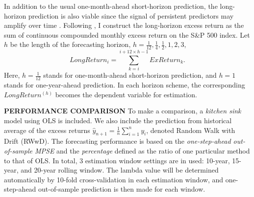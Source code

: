 \documentclass[12pt,a4paper]{article}
\begin{document}
In addition to the usual one-month-ahead short-horizon prediction, the long-horizon prediction is also viable since the signal of persistent predictors may amplify over time \citep{cochrane2009asset}. Following \cite{lee2018lasso}, I construct the long-horizon excess return as the sum of continuous compounded monthly excess return on the S\&P 500 index. Let $ h $ be the length of the forecasting horizon, $ h = \frac{1}{12}, \frac{1}{4}, \frac{1}{2}, 1, 2, 3 $, 
\begin{equation*}
	LongReturn_i = \sum_{k=i}^{i + 12 \times h - 1} ExReturn_k.
\end{equation*}
Here, $ h = \frac{1}{12} $ stands for one-month-ahead short-horizon prediction, and $ h = 1 $ stands for one-year-ahead prediction. In each horizon scheme, the corresponding $ LongReturn^{(h)} $ becomes the dependent variable for estimation.

\textbf{PERFORMANCE COMPARISON} To make a comparison, a \textit{kitchen sink} model using OLS is included. We also include the prediction from historical average of the excess returns $ \hat{y}_{n + 1} = \frac{1}{n} \sum^n_{i = 1}y_i $, denoted Random Walk with Drift (RWwD). The forecasting performance is based on the \textit{one-step-ahead out-of-sample MPSE} and the \textit{percentage} defined as the ratio of one particular method to that of OLS. In total, 3 estimation window settings are in used: 10-year, 15-year, and 20-year rolling window. The lambda value will be determined automatically by 10-fold cross-validation in each estimation window, and one-step-ahead out-of-sample prediction is then made for each window.
\end{document}
